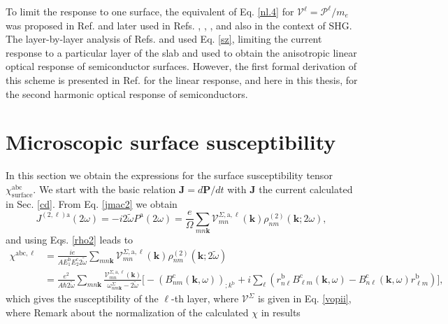 To limit the response to one surface, the equivalent of Eq. \eqref{nl.4} for
$\boldsymbol{\mathcal{V}}^\ell=\boldsymbol{\mathcal{P}}^\ell/m_{e}$ was proposed
in Ref. \cite{reiningPRB94} and later used in Refs. \cite{mendozaPRL98},
\cite{mendozaPRB01}, \cite{sanoPRB02}, and \cite{mejiaRMF04} also in the context
of SHG. The layer-by-layer analysis of Refs. \cite{hoganPRB03} and
\cite{castilloPRB03} used Eq. \eqref{sz}, limiting the current response to a
particular layer of the slab and used to obtain the anisotropic linear optical
response of semiconductor surfaces. However, the first formal derivation of this
scheme is presented in Ref. \cite{mendozaPRB06} for the linear response, and
here in this thesis, for the second harmonic optical response of semiconductors.


\section{Microscopic surface susceptibility}
In this section we obtain the expressions for the 
surface susceptibility tensor $\chi^{\mathrm{abc}}_{\mathrm{surface}}$.
We start with the basic relation $\mathbf{J} = d\mathbf{P}/dt$ 
with $\mathbf{J}$ the current calculated in Sec. \ref{cd}. From Eq. \eqref{jmac2} 
we obtain
\begin{equation}\label{Pjikn}
J^{(2,\ell)\mathrm{a}}(2\omega)=-i2\tilde{\omega} P^{\mathrm{a}}(2\omega)
=\frac{e}{\Omega}
\sum_{mn\mathbf{k}}
\mathcal{V}^{\Sigma,\mathrm{a},\ell}_{mn}(\mathbf{k})
\rho^{(2)}_{nm}(\mathbf{k};2\omega)
,
\end{equation}
and using Eqs. \eqref{rho2} leads to
\begin{align}\label{Pjikn2}
\chi^{\mathrm{abc},\ell}
&=
\frac{ie}{A E^{\mathrm{b}}_1E^{\mathrm{c}}_2 2\tilde{\omega}}
\sum_{mn\mathbf{k}}
\mathcal{V}^{\Sigma,\mathrm{a},\ell}_{mn}(\mathbf{k})
\rho^{(2)}_{nm}(\mathbf{k};2\tilde{\omega})
\nonumber \\
&=
\frac{e^2}{A\hbar2\tilde{\omega}}
\sum_{mn\mathbf{k}}
\frac{\mathcal{V}^{\Sigma,\mathrm{a},\ell}_{mn}(\mathbf{k})}
{\omega^\Sigma_{nm\mathbf{k}}-2\tilde{\omega}}
\bigg[
-(B_{nm}^{\mathrm{c}}(\mathbf{k},\omega))_{;k^{\mathrm{b}}}
+i\sum_\ell\left(r_{n\ell}^{\mathrm{b}}B_{\ell m}^{\mathrm{c}}(\mathbf{k},\omega) -
  B_{n\ell}^{\mathrm{c}}(\mathbf{k},\omega) 
  r_{\ell m}^{\mathrm{b}}\right)
\bigg]
,
\end{align}
which gives the susceptibility of the $\ell$-th layer, where
$\boldsymbol{\mathcal{V}}^\Sigma$ is given in Eq. \eqref{vopii}, where
{\color{red} Remark about the normalization of the calculated $\chi$ in results}
